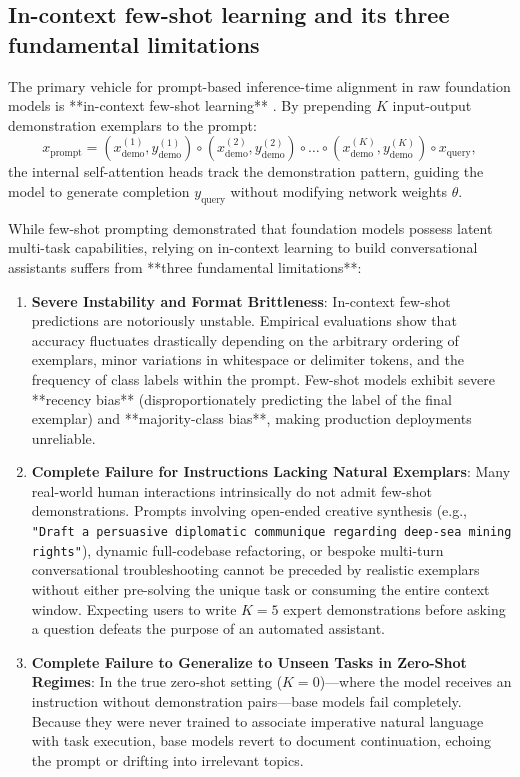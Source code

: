 \documentclass[../../main.tex]{subfiles}
\begin{document}
\subsection{In-context few-shot learning and its three fundamental limitations}
\label{subsec:in_context_limitations}

The primary vehicle for prompt-based inference-time alignment in raw foundation models is **in-context few-shot learning** \citep{brown2020}. By prepending $K$ input-output demonstration exemplars to the prompt:
\begin{equation}
\label{eq:few_shot_context_structure}
x_{\text{prompt}} = \left( x_{\text{demo}}^{(1)}, y_{\text{demo}}^{(1)} \right) \circ \left( x_{\text{demo}}^{(2)}, y_{\text{demo}}^{(2)} \right) \circ \dots \circ \left( x_{\text{demo}}^{(K)}, y_{\text{demo}}^{(K)} \right) \circ x_{\text{query}},
\end{equation}
the internal self-attention heads track the demonstration pattern, guiding the model to generate completion $y_{\text{query}}$ without modifying network weights $\theta$.

While few-shot prompting demonstrated that foundation models possess latent multi-task capabilities, relying on in-context learning to build conversational assistants suffers from **three fundamental limitations**:
\begin{enumerate}
    \item \textbf{Severe Instability and Format Brittleness}: In-context few-shot predictions are notoriously unstable. Empirical evaluations show that accuracy fluctuates drastically depending on the arbitrary ordering of exemplars, minor variations in whitespace or delimiter tokens, and the frequency of class labels within the prompt. Few-shot models exhibit severe **recency bias** (disproportionately predicting the label of the final exemplar) and **majority-class bias**, making production deployments unreliable.
    \item \textbf{Complete Failure for Instructions Lacking Natural Exemplars}: Many real-world human interactions intrinsically do not admit few-shot demonstrations. Prompts involving open-ended creative synthesis (e.g., \texttt{"Draft a persuasive diplomatic communique regarding deep-sea mining rights"}), dynamic full-codebase refactoring, or bespoke multi-turn conversational troubleshooting cannot be preceded by realistic exemplars without either pre-solving the unique task or consuming the entire context window. Expecting users to write $K=5$ expert demonstrations before asking a question defeats the purpose of an automated assistant.
    \item \textbf{Complete Failure to Generalize to Unseen Tasks in Zero-Shot Regimes}: In the true zero-shot setting ($K=0$)---where the model receives an instruction without demonstration pairs---base models fail completely. Because they were never trained to associate imperative natural language with task execution, base models revert to document continuation, echoing the prompt or drifting into irrelevant topics.
\end{enumerate}
\end{document}
